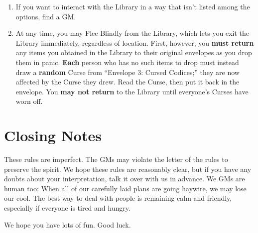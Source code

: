 \documentclass[sheet]{GL2020}
\begin{document}
\begin{enumerate}
	\item If you want to interact with the Library in a way that isn’t listed among the options, find a GM.
	\item At any time, you may Flee Blindly from the Library, which lets you exit the Library immediately, regardless of location. First, however, you \textbf{must return} any items you obtained in the Library to their original envelopes as you drop them in panic. \textbf{Each} person who has no such items to drop must instead draw a \textbf{random} Curse from “Envelope 3: Cursed Codices;” they are now affected by the Curse they drew. Read the Curse, then put it back in the envelope. You \textbf{may not return} to the Library until everyone's Curses have worn off. 
\end{enumerate}

\section{Closing Notes}

These rules are imperfect. The GMs may violate the letter of the rules to preserve the spirit. We hope these rules are reasonably clear, but if you have any doubts about your interpretation, talk it over with us in advance. We GMs are human too: When all of our carefully laid plans are going haywire, we may lose our cool. The best way to deal with people is remaining calm and friendly, especially if everyone is tired and hungry.

We hope you have lots of fun. Good luck.
\end{document}
